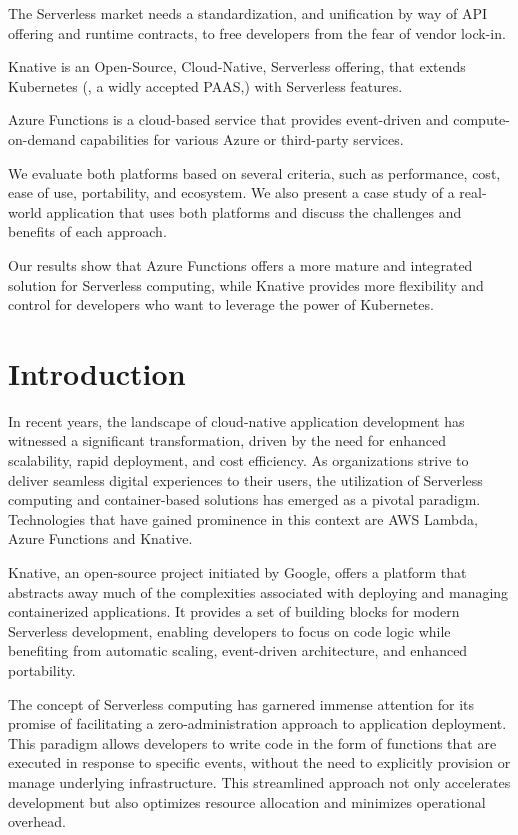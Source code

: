 \documentclass{article}
\begin{document}
The Serverless market needs a standardization, and unification by way of API offering and runtime contracts, to free developers from the fear of vendor lock-in. 

Knative is an Open-Source, Cloud-Native, Serverless offering, that extends Kubernetes (, a widly accepted PAAS,) with Serverless features. 

Azure Functions is a cloud-based service that provides event-driven and compute-on-demand capabilities for various Azure or third-party services. 

We evaluate both platforms based on several criteria, such as performance, cost, ease of use, portability, and ecosystem. We also present a case study of a real-world application that uses both platforms and discuss the challenges and benefits of each approach. 

Our results show that Azure Functions offers a more mature and integrated solution for Serverless computing, while Knative provides more flexibility and control for developers who want to leverage the power of Kubernetes.
    

\pagebreak

\section*{Introduction}
In recent years, the landscape of cloud-native application development has witnessed a significant transformation, driven by the need for enhanced scalability, rapid deployment, and cost efficiency. As organizations strive to deliver seamless digital experiences to their users, the utilization of Serverless computing and container-based solutions has emerged as a pivotal paradigm. Technologies that have gained prominence in this context are AWS Lambda, Azure Functions and Knative.

Knative, an open-source project initiated by Google, offers a platform that abstracts away much of the complexities associated with deploying and managing containerized applications. It provides a set of building blocks for modern Serverless development, enabling developers to focus on code logic while benefiting from automatic scaling, event-driven architecture, and enhanced portability.

The concept of Serverless computing has garnered immense attention for its promise of facilitating a zero-administration approach to application deployment. This paradigm allows developers to write code in the form of functions that are executed in response to specific events, without the need to explicitly provision or manage underlying infrastructure. This streamlined approach not only accelerates development but also optimizes resource allocation and minimizes operational overhead.
\end{document}
